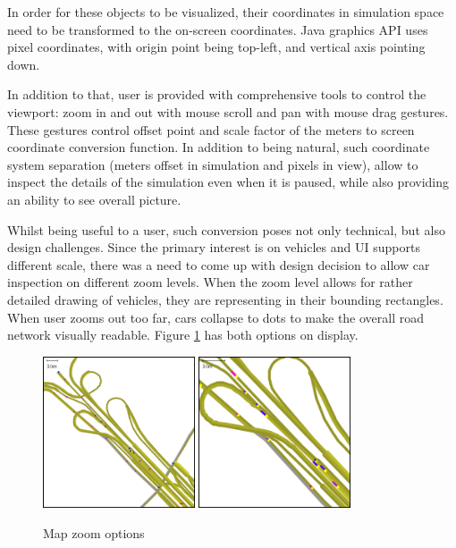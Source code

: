 In order for these objects to be visualized, their coordinates in simulation space need to be transformed to the on-screen coordinates. Java graphics API uses pixel coordinates, with origin point being top-left, and vertical axis pointing down.

In addition to that, user is provided with comprehensive tools to control the viewport: zoom in and out with mouse scroll and pan with mouse drag gestures. These gestures control offset point and scale factor of the meters to screen coordinate conversion function. In addition to being natural, such coordinate system separation (meters offset in simulation and pixels in view), allow to inspect the details of the simulation even when it is paused, while also providing an ability to see overall picture.

Whilst being useful to a user, such conversion poses not only technical, but also design challenges. Since the primary interest is on vehicles and UI supports different scale, there was a need to come up with design decision to allow car inspection on different zoom levels. When the zoom level allows for rather detailed drawing of vehicles, they are representing in their bounding rectangles. When user zooms out too far, cars collapse to dots to make the overall road network visually readable. Figure \ref{fig:mapZoomOptions} has both options on display.
\begin{figure}[!h]
    \vspace{1.5em}
    \caption{Map zoom options}
    \label{fig:mapZoomOptions}
    \centering
    \includegraphics[width=0.4\textwidth]{figs/road/zoom_dots.png}
    \hspace{0.2em}
    \includegraphics[width=0.4\textwidth]{figs/road/zoom_cars.png}
\end{figure}


